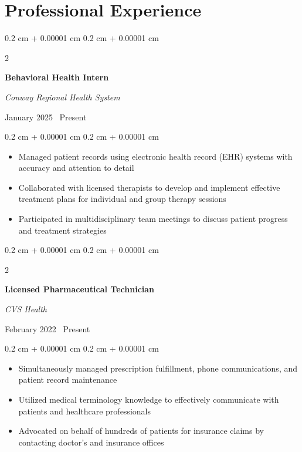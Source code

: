 \documentclass[10pt, letterpaper]{article}
\newenvironment{highlights}{
    \begin{itemize}[
        topsep=0.10 cm,
        parsep=0.10 cm,
        partopsep=0pt,
        itemsep=0pt,
        leftmargin=0.4 cm + 10pt
    ]
}{
    \end{itemize}
} %
\newenvironment{onecolentry}{
    \begin{adjustwidth}{
        0.2 cm + 0.00001 cm
    }{
        0.2 cm + 0.00001 cm
    }
}{
    \end{adjustwidth}
} %
\newenvironment{twocolentry}[2][]{
    \onecolentry
    \def\secondColumn{#2}
    \setcolumnwidth{\fill, 4.5 cm}
    \begin{paracol}{2}
}{
    \switchcolumn \raggedleft \secondColumn
    \end{paracol}
    \endonecolentry
} %
\begin{document}
\section{Professional Experience}

\begin{twocolentry}
    {
        January 2025 \textendash\ Present
    }
    \textbf{Behavioral Health Intern}

    \textit{Conway Regional Health System}
\end{twocolentry}

\vspace{0.10 cm}

\begin{onecolentry}
    \begin{highlights}
        \item Managed patient records using electronic health record (EHR) systems with accuracy and attention to detail
        \item Collaborated with licensed therapists to develop and implement effective treatment plans for individual and group therapy sessions
        \item Participated in multidisciplinary team meetings to discuss patient progress and treatment strategies
        \end{highlights}
\end{onecolentry}

\vspace{0.2 cm}

\begin{twocolentry}
    {
        February 2022 \textendash\ Present
    }
    \textbf{Licensed Pharmaceutical Technician}

    \textit{CVS Health}
\end{twocolentry}

\vspace{0.10 cm}
\begin{onecolentry}
    \begin{highlights}
        \item Simultaneously managed prescription fulfillment, phone communications, and patient record maintenance
        \item Utilized medical terminology knowledge to effectively communicate with patients and healthcare professionals
        \item Advocated on behalf of hundreds of patients for insurance claims by contacting doctor's and insurance offices
    \end{highlights}
\end{onecolentry}
\end{document}
